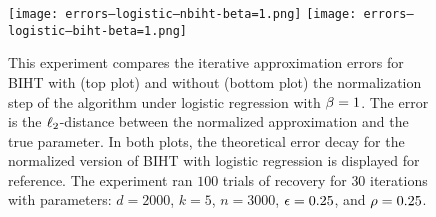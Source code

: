 \begin{figure}
%
%
\texttt{[image: errors--logistic--nbiht-beta=1.png]}
\texttt{[image: errors--logistic--biht-beta=1.png]}
\caption{\label{fig:error-decay-nbiht-biht-comparison-beta=1-plot:logistic-regression}
This experiment compares the iterative approximation errors for BIHT with (top plot) and without (bottom plot) the normalization step of the algorithm under logistic regression with \betaXnamelr \(  \beta = 1  \).
The error is the \(  \ell_{2}  \)-distance between the normalized approximation and the true parameter.
In both plots, the theoretical error decay for the normalized version of BIHT with logistic regression is displayed for reference.
The experiment ran \(  100  \) trials of recovery for \(  30  \) iterations with parameters: \(  d = 2000  \), \(  k = 5  \), \(  n = 3000  \), \(  \epsilon = 0.25  \), and \(  \rho = 0.25  \).%
}
%
\end{figure}

